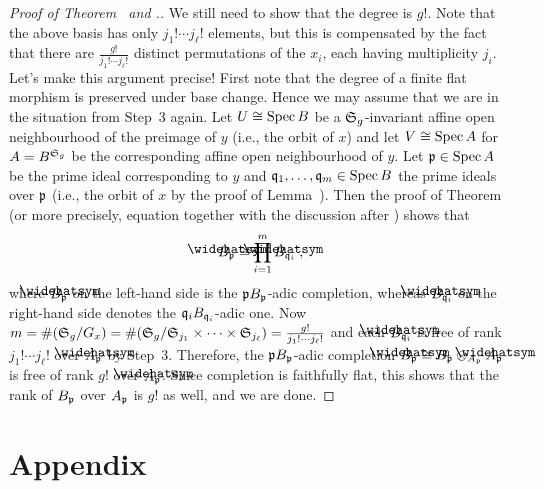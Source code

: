\documentclass[a4paper,parskip=half,numbers=enddot, DIV=12]{scrreprt}
\begin{document}
\begin{proof}[Proof of Theorem~ and .]
	We still need to show that the degree is $g!$. Note that the above basis has only $j_1!\cdots j_\ell!$ elements, but this is compensated by the fact that there are $\frac{g!}{j_1!\cdots j_\ell!}$ distinct permutations of the $x_i$, each having multiplicity $j_i$. Let's make this argument precise! First note that the degree of a finite flat morphism is preserved under base change. Hence we may assume that we are in the situation from Step~3 again. Let $U\cong \operatorname{Spec} B$ be a $\mathfrak{S}_g$-invariant affine open neighbourhood of the preimage of $y$ (i.e., the orbit of $x$) and let $V\cong \operatorname{Spec} A$ for $A=B^{\mathfrak{S}_g}$ be the corresponding affine open neighbourhood of $y$. Let $\mathfrak{p}\in \operatorname{Spec} A$ be the prime ideal corresponding to $y$ and $\mathfrak{q}_1,\ldots,\mathfrak{q}_m\in\operatorname{Spec} B$ the prime ideals over $\mathfrak{p}$ (i.e., the orbit of $x$ by the proof of Lemma~). Then the proof of Theorem~ (or more precisely, equation  together with the discussion after ) shows that
	\begin{align}\lbl{eq:BpBqi}
		\roof{B}_\pp\cong \prod_{i=1}^m\roof{B}_{\qq_i}\;,
	\end{align}
	where $\roof{B}_\pp$ on the left-hand side is the $\mathfrak{p} B_{\mathfrak{p}}$-adic completion, whereas $\roof{B}_{\qq_i}$ on the right-hand side denotes the $\mathfrak{q}_iB_{\mathfrak{q}_i}$-adic one. Now $m=\#(\mathfrak{S}_g/G_x)=\#(\mathfrak{S}_g/\mathfrak{S}_{j_1}\times\cdots\times\mathfrak{S}_{j_\ell})=\frac{g!}{j_1!\cdots j_\ell!}$ and each $\roof{B}_{\qq_i}$ is free of rank $j_1!\cdots j_\ell!$ over $\roof{A}_\pp$ by Step~3. Therefore, the $\mathfrak{p} B_{\mathfrak{p}}$-adic completion $\roof{B}_\pp\cong B_\pp\otimes_{A_\pp}\roof{A}_\pp$ is free of rank $g!$ over $\roof{A}_\pp$. Since completion is faithfully flat, this shows that the rank of $B_{\mathfrak{p}}$ over $A_{\mathfrak{p}}$ is $g!$ as well, and we are done.
\end{proof}



\Appendix
\chapter{Appendix}
\end{document}
